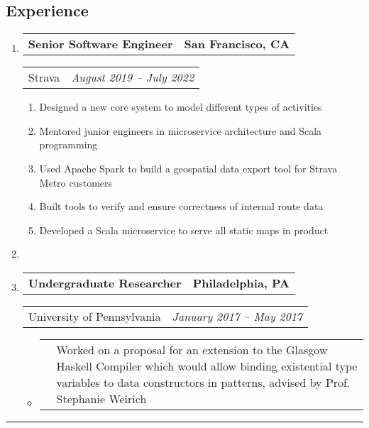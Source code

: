 \documentclass[letterpaper]{article}
\makeatletter
\newcommand*{\tabulardef}[3]{\begin{tabular}[t]{@{}lp{\dimexpr\linewidth-#1}@{}}
    #2&#3
\end{tabular}}
\newcommand{\headerrow}[2]
{\begin{tabular*}{\linewidth}{l@{\extracolsep{\fill}}r}
	#1 &
	#2 \\
\end{tabular*}}
\makeatother
\begin{document}
\subsection*{Experience}

\begin{enumerate}[label=]
	\parskip=-0.25em

	\item
		\headerrow
			{\textbf{Senior Software Engineer}}
			{\textbf{San Francisco, CA}}
	\headerrow
		{Strava}
		{\emph{August 2019 -- July 2022}}
	\begin{enumerate}[label= *]
	\parskip=-0.1em
        \item Designed a new core system to model different types of activities
        \item Mentored junior engineers in microservice architecture and Scala programming
		\item Used Apache Spark to build a geospatial data export tool for Strava Metro customers
		\item Built tools to verify and ensure correctness of internal route data
		\item Developed a Scala microservice to serve all static maps in product
	\end{enumerate}
	
    \item 

	\item
		\headerrow
			{\textbf{Undergraduate Researcher}}
			{\textbf{Philadelphia, PA}}
	\headerrow
		{University of Pennsylvania}
		{\emph{January 2017 -- May 2017}}
  	\begin{itemize}[label= *]
	\parskip=-0.1em
		\item\tabulardef{5cm}{}{Worked on a proposal for an extension to the Glasgow Haskell Compiler which would allow binding existential type variables to data constructors in patterns, advised by Prof. Stephanie Weirich}
	\end{itemize}
\end{enumerate}

\hrule
\vspace{-0.6em}
\end{document}
